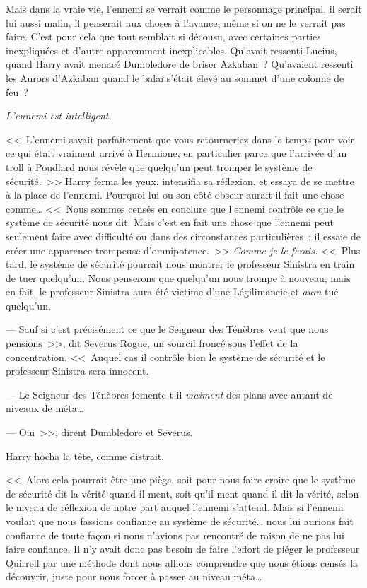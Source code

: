 Mais dans la vraie vie, l'ennemi se verrait comme le personnage principal, il serait lui aussi malin, il penserait aux choses à l'avance, même si on ne le verrait pas faire. C'est pour cela que tout semblait si décousu, avec certaines parties inexpliquées et d'autre apparemment inexplicables. Qu'avait ressenti Lucius, quand Harry avait menacé Dumbledore de briser Azkaban~? Qu'avaient ressenti les Aurors d'Azkaban quand le balai s'était élevé au sommet d'une colonne de feu~?

\emph{L'ennemi est intelligent.}

<<~L'ennemi savait parfaitement que vous retourneriez dans le temps pour voir ce qui était vraiment arrivé à Hermione, en particulier parce que l'arrivée d'un troll à Poudlard nous révèle que quelqu'un peut tromper le système de sécurité.~>> Harry ferma les yeux, intensifia sa réflexion, et essaya de se mettre à la place de l'ennemi. Pourquoi lui ou son côté obscur aurait-il fait une chose comme… <<~Nous sommes censés en conclure que l'ennemi contrôle ce que le système de sécurité nous dit. Mais c'est en fait une chose que l'ennemi peut seulement faire avec difficulté ou dans des circonstances particulières~; il essaie de créer une apparence trompeuse d'omnipotence.~>> \emph{Comme je le ferais.} <<~Plus tard, le système de sécurité pourrait nous montrer le professeur Sinistra en train de tuer quelqu'un. Nous penserons que quelqu'un nous trompe à nouveau, mais en fait, le professeur Sinistra aura été victime d'une Légilimancie et \emph{aura} tué quelqu'un.

--- Sauf si c'est précisément ce que le Seigneur des Ténèbres veut que nous pensions~>>, dit Severus Rogue, un sourcil froncé sous l'effet de la concentration. <<~Auquel cas il contrôle bien le système de sécurité et le professeur Sinistra sera innocent.

--- Le Seigneur des Ténèbres fomente-t-il \emph{vraiment} des plans avec autant de niveaux de méta…

--- Oui~>>, dirent Dumbledore et Severus.

Harry hocha la tête, comme distrait.

<<~Alors cela pourrait être une piège, soit pour nous faire croire que le système de sécurité dit la vérité quand il ment, soit qu'il ment quand il dit la vérité, selon le niveau de réflexion de notre part auquel l'ennemi s'attend. Mais si l'ennemi voulait que nous fassions confiance au système de sécurité… nous lui aurions fait confiance de toute façon si nous n'avions pas rencontré de raison de ne pas lui faire confiance. Il n'y avait donc pas besoin de faire l'effort de piéger le professeur Quirrell par une méthode dont nous allions comprendre que nous étions censés la découvrir, juste pour nous forcer à passer au niveau méta…

